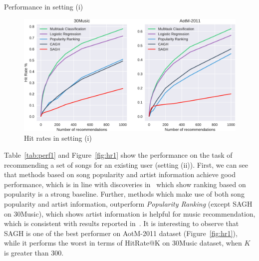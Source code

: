 \begin{table}[h]
\centering
\caption{Performance in setting (i)}
\label{tab:perf0}
\resizebox{\columnwidth}{!}{

}
\end{table}

\begin{figure}[h]
\centering
\includegraphics[width=.975\linewidth]{fig/hitrate0.pdf}
\caption{Hit rates in setting (i)}
\label{fig:hr0}
\end{figure}


Table~\ref{tab:perf1} and Figure~\ref{fig:hr1} show the performance on the task of recommending a set of songs for
an existing user (setting (ii)).
First, we can see that methods based on song popularity and artist information achieve good performance,
which is in line with discoveries in~\cite{bonnin2013evaluating,jannach2015beyond,bonnin2015automated} which 
show ranking based on popularity is a strong baseline.
Further, methods which make use of both song popularity and artist information,
outperform {\it Popularity Ranking} (except SAGH on 30Music), which shows artist information is helpful for music recommendation,
which is consistent with results reported in~\cite{bonnin2013evaluating,bonnin2015automated}.
%
It is interesting to observe that SAGH is one of the best performer on AotM-2011 dataset (Figure~\ref{fig:hr1}), 
while it performs the worst in terms of HitRate@K on 30Music dataset, when $K$ is greater than 300.
%


